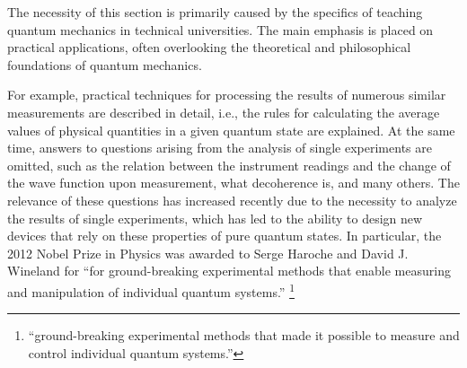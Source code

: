 The necessity of this section is primarily caused by the specifics
of teaching quantum mechanics in technical universities. The main emphasis
is placed on practical applications, often overlooking
the theoretical and philosophical foundations of quantum mechanics.

For example, practical techniques for processing
the results of numerous similar measurements are described in detail, i.e., the rules
for calculating the average values of physical quantities in
a given quantum state are explained. At the same time, answers to questions
arising from the analysis of single experiments are omitted, such as the relation
between the instrument readings and the change of the wave function upon measurement, what
decoherence 
is, and many others. The relevance of these questions
has increased recently due to the necessity to analyze
the results of single experiments, which has led to the ability
to design new devices that rely on these properties of pure
quantum states. In particular, the 2012 Nobel Prize in Physics
was awarded to Serge Haroche and
David J. Wineland for ``for ground-breaking experimental methods that enable measuring and manipulation of individual quantum systems.''
\footnote{
``ground-breaking
experimental methods that made it possible to measure
and control individual quantum systems.''}